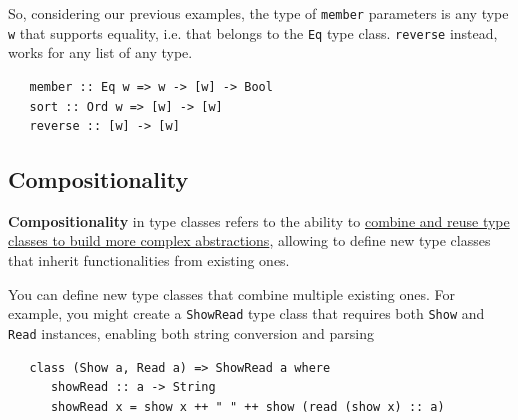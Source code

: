 So, considering our previous examples, the type of \lstinline|member| parameters is any type \lstinline|w| that supports equality, i.e. that belongs to the \lstinline|Eq| type class.
\lstinline|reverse| instead, works for any list of any type.
\begin{lstlisting}
   member :: Eq w => w -> [w] -> Bool
   sort :: Ord w => [w] -> [w]
   reverse :: [w] -> [w]
\end{lstlisting}


\subsection{Compositionality}
\textbf{Compositionality} in type classes refers to the ability to \ul{combine and reuse type classes to build more complex abstractions}, allowing to define new type classes that inherit functionalities from existing ones.

You can define new type classes that combine multiple existing ones. For example, you might create a \lstinline|ShowRead| type class that requires both \lstinline|Show| and \lstinline|Read| instances, enabling both string conversion and parsing
\begin{lstlisting}
   class (Show a, Read a) => ShowRead a where
      showRead :: a -> String
      showRead x = show x ++ " " ++ show (read (show x) :: a)

\end{lstlisting}


